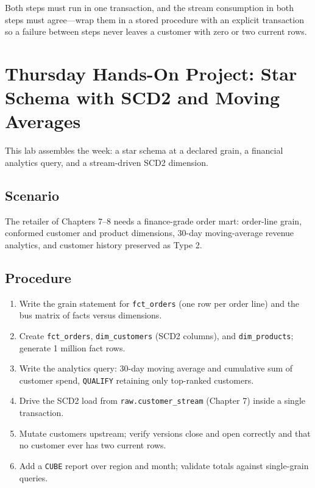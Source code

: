 \begin{notebox}
Both steps must run in one transaction, and the stream consumption in both steps must agree---wrap them in a stored procedure with an explicit transaction so a failure between steps never leaves a customer with zero or two current rows.
\end{notebox}

\section{Thursday Hands-On Project: Star Schema with SCD2 and Moving Averages}
This lab assembles the week: a star schema at a declared grain, a financial analytics query, and a stream-driven SCD2 dimension.

\subsection*{Scenario}
The retailer of Chapters 7--8 needs a finance-grade order mart: order-line grain, conformed customer and product dimensions, 30-day moving-average revenue analytics, and customer history preserved as Type 2.

\subsection*{Procedure}
\begin{enumerate}
    \item Write the grain statement for \texttt{fct\_orders} (one row per order line) and the bus matrix of facts versus dimensions.
    \item Create \texttt{fct\_orders}, \texttt{dim\_customers} (SCD2 columns), and \texttt{dim\_products}; generate 1 million fact rows.
    \item Write the analytics query: 30-day moving average and cumulative sum of customer spend, \texttt{QUALIFY} retaining only top-ranked customers.
    \item Drive the SCD2 load from \texttt{raw.customer\_stream} (Chapter 7) inside a single transaction.
    \item Mutate customers upstream; verify versions close and open correctly and that no customer ever has two current rows.
    \item Add a \texttt{CUBE} report over region and month; validate totals against single-grain queries.
\end{enumerate}

